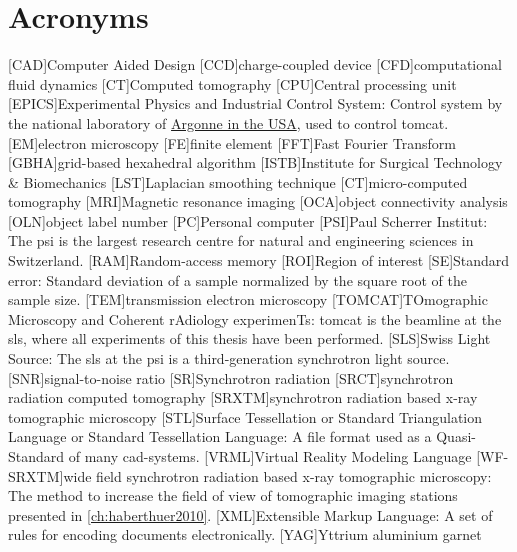     \chapter*{Acronyms}
	\begin{acronym}[WF-SRXTM]
		[CAD]{Computer Aided Design}
		[CCD]{charge-coupled device}
		[CFD]{computational fluid dynamics}
		[CT]{Computed tomography}
		[CPU]{Central processing unit}
		[EPICS]{Experimental Physics and Industrial Control System}: Control system by the national laboratory of \href{http://www.aps.anl.gov/epics/}{Argonne in the USA}, used to control \acs{tomcat}.
		[EM]{electron microscopy}
		[FE]{finite element}
		[FFT]{Fast Fourier Transform}
		{grid-based hexahedral algorithm}
		{Institute for Surgical Technology \& Biomechanics}
		[LST]{Laplacian smoothing technique}
		[\micro CT]{micro-computed tomography}
		[MRI]{Magnetic resonance imaging}
		[OCA]{object connectivity analysis}
		[OLN]{object label number}
		[PC]{Personal computer}
		[PSI]{Paul Scherrer Institut}: The \acs{psi} is the largest research centre for natural and engineering sciences in Switzerland.
		[RAM]{Random-access memory}
		[ROI]{Region of interest}
		[SE]{Standard error}: Standard deviation of a sample normalized by the square root of the sample size.
		[TEM]{transmission electron microscopy}
		[TOMCAT]{TOmographic Microscopy and Coherent rAdiology experimenTs}: \acs{tomcat} is the beamline at the \acs{sls}, where all experiments of this thesis have been performed.
		[SLS]{Swiss Light Source}: The \acs{sls} at the \acs{psi} is a third-generation synchrotron light source.
		[SNR]{signal-to-noise ratio}
		[SR]{Synchrotron radiation}
		{synchrotron radiation computed tomography}
		[SRXTM]{synchrotron radiation based x-ray tomographic microscopy}
		[STL]{Surface Tessellation or Standard Triangulation Language or Standard Tessellation Language}: A file format used as a Quasi-Standard of many \acs{cad}-systems.
		{Virtual Reality Modeling Language}
		[WF-SRXTM]{wide field synchrotron radiation based x-ray tomographic microscopy}: The method to increase the field of view of tomographic imaging stations presented in \autoref{ch:haberthuer2010}.
		[XML]{Extensible Markup Language}: A set of rules for encoding documents electronically.
		[YAG]{Yttrium aluminium garnet}
	\end{acronym}
\endgroup

\cleardoublepage